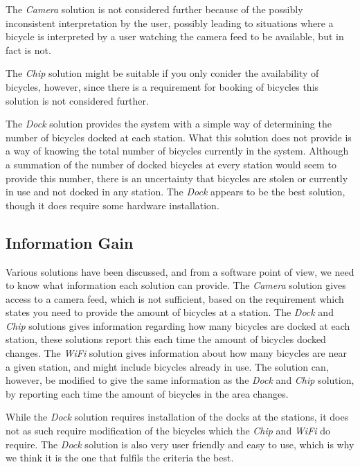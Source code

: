 The \textit{Camera} solution is not considered further because of the possibly inconsistent interpretation by the user, possibly leading to situations where a bicycle is interpreted by a user watching the camera feed to be available, but in fact is not.

The \textit{Chip} solution might be suitable if you only conider the availability of bicycles, however, since there is a requirement for booking of bicycles this solution is not considered further.

The \textit{Dock} solution provides the system with a simple way of determining the number of bicycles docked at each station.
What this solution does not provide is a way of knowing the total number of bicycles currently in the system.
Although a summation of the number of docked bicycles at every station would seem to provide this number, there is an uncertainty that bicycles are stolen or currently in use and not docked in any station.
The \textit{Dock} appears to be the best solution, though it does require some hardware installation.

\subsection{Information Gain}
Various solutions have been discussed, and from a software point of view, we need to know what information each solution can provide.
The \textit{Camera} solution gives access to a camera feed, which is not sufficient, based on the requirement which states you need to provide the amount of bicycles at a station.
The \textit{Dock} and \textit{Chip} solutions gives information regarding how many bicycles are docked at each station, these solutions report this each time the amount of bicycles docked changes.
The \textit{WiFi} solution gives information about how many bicycles are near a given station, and might include bicycles already in use.
The solution can, however, be modified to give the same information as the \textit{Dock} and \textit{Chip} solution, by reporting each time the amount of bicycles in the area changes.

While the \textit{Dock} solution requires installation of the docks at the stations, it does not as such require modification of the bicycles which the \textit{Chip} and \textit{WiFi} do require. 
The \textit{Dock} solution is also very user friendly and easy to use, which is why we think it is the one that fulfils the criteria the best.